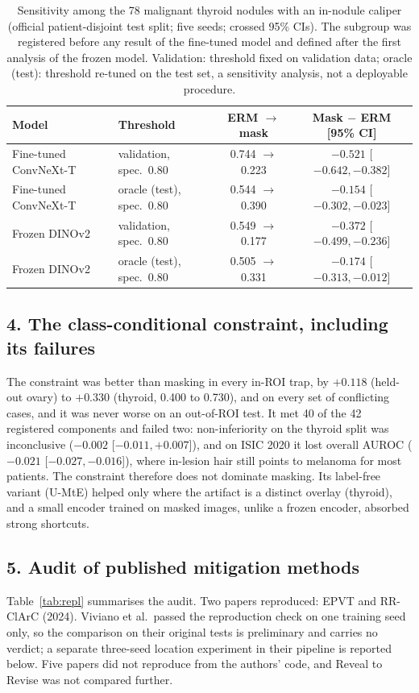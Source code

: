 \documentclass[12pt]{article}
\begin{document}
\begin{table}[t]\centering\small
\setlength{\tabcolsep}{4pt}
\caption{Sensitivity among the 78 malignant thyroid nodules with an in-nodule caliper (official patient-disjoint test
split; five seeds; crossed 95\% CIs). The subgroup was registered before any result of the fine-tuned model and defined
after the first analysis of the frozen model. Validation: threshold fixed on validation data; oracle (test): threshold re-tuned on the test set, a
sensitivity analysis, not a deployable procedure.}\label{tab:clinical}
\begin{tabular}{llcc}\toprule
Model & Threshold & ERM $\to$ mask & Mask $-$ ERM [95\% CI]\\\midrule
Fine-tuned ConvNeXt-T & validation, spec.\ 0.80 & 0.744 $\to$ 0.223 & $-0.521$ [$-0.642, -0.382$]\\
Fine-tuned ConvNeXt-T & oracle (test), spec.\ 0.80 & 0.544 $\to$ 0.390 & $-0.154$ [$-0.302, -0.023$]\\
Frozen DINOv2 & validation, spec.\ 0.80 & 0.549 $\to$ 0.177 & $-0.372$ [$-0.499, -0.236$]\\
Frozen DINOv2 & oracle (test), spec.\ 0.80 & 0.505 $\to$ 0.331 & $-0.174$ [$-0.313, -0.012$]\\
\bottomrule\end{tabular}\end{table}

\subsection*{4. The class-conditional constraint, including its failures}
The constraint was better than masking in every in-ROI trap, by $+0.118$ (held-out ovary) to $+0.330$ (thyroid, 0.400 to
0.730), and on every set of conflicting cases, and it was never worse on an out-of-ROI test. It met 40 of the 42
registered components and failed two: non-inferiority on the thyroid split was inconclusive ($-0.002$
[$-0.011, +0.007$]), and on ISIC 2020 it lost overall AUROC ($-0.021$ [$-0.027, -0.016$]), where in-lesion hair still
points to melanoma for most patients. The constraint therefore does not dominate masking. Its label-free variant (U-MtE)
helped only where the artifact is a distinct overlay (thyroid), and a small encoder trained on masked images, unlike a
frozen encoder, absorbed strong shortcuts.

\subsection*{5. Audit of published mitigation methods}
Table~\ref{tab:repl} summarises the audit. Two papers reproduced: EPVT and RR-ClArC (2024). Viviano et al.\ passed the
reproduction check on one training seed only, so the comparison on their original tests is preliminary and carries no
verdict; a separate three-seed location experiment in their pipeline is reported below. Five papers did not reproduce
from the authors' code, and Reveal to Revise was not compared further.
\end{document}
